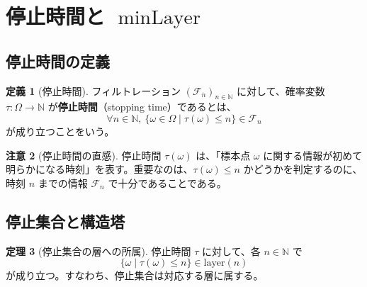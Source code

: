 \documentclass[12pt,a4paper]{article}
\theoremstyle{definition}
\newtheorem{definition}{定義}[section]
\newtheorem{theorem}[definition]{定理}
\newtheorem{remark}[definition]{注意}
\newcommand{\N}{\mathbb{N}}
\newcommand{\cF}{\mathcal{F}}
\DeclareMathOperator{\minLayer}{minLayer}
\begin{document}
\section{停止時間と $\minLayer$}\label{sec:stopping}

\subsection{停止時間の定義}

\begin{definition}[停止時間]
フィルトレーション $(\cF_n)_{n \in \N}$ に対して、確率変数 $\tau : \Omega \to \N$ が\textbf{停止時間}（stopping time）であるとは、
\[
\forall n \in \N,\ \{\omega \in \Omega \mid \tau(\omega) \leq n\} \in \cF_n
\]
が成り立つことをいう。
\end{definition}

\begin{remark}[停止時間の直感]
停止時間 $\tau(\omega)$ は、「標本点 $\omega$ に関する情報が初めて明らかになる時刻」を表す。重要なのは、$\tau(\omega) \leq n$ かどうかを判定するのに、時刻 $n$ までの情報 $\cF_n$ で十分であることである。
\end{remark}

\begin{center}
\end{center}

\subsection{停止集合と構造塔}

\begin{theorem}[停止集合の層への所属]
停止時間 $\tau$ に対して、各 $n \in \N$ で
\[
\{\omega \mid \tau(\omega) \leq n\} \in \text{layer}(n)
\]
が成り立つ。すなわち、停止集合は対応する層に属する。
\end{theorem}
\end{document}
